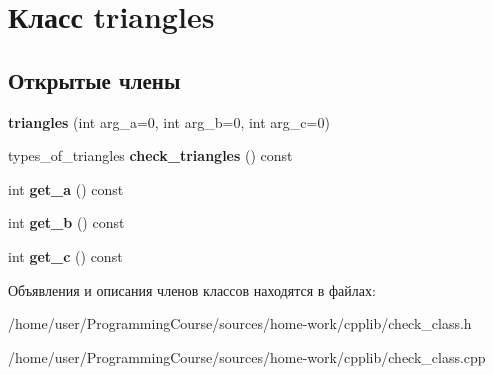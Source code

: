 \hypertarget{classtriangles}{\section{Класс triangles}
\label{classtriangles}
}
\subsection*{Открытые члены}
\begin{DoxyCompactItemize}
\item 
\hypertarget{classtriangles_a4dd5e3a7da283a2102661981b85dbd66}{{\bfseries triangles} (int arg\+\_\+a=0, int arg\+\_\+b=0, int arg\+\_\+c=0)}\label{classtriangles_a4dd5e3a7da283a2102661981b85dbd66}

\item 
\hypertarget{classtriangles_adb2135c351a8416cb284cd1e61eb32e3}{types\+\_\+of\+\_\+triangles {\bfseries check\+\_\+triangles} () const }\label{classtriangles_adb2135c351a8416cb284cd1e61eb32e3}

\item 
\hypertarget{classtriangles_a05d61fccb6914f46b382b5e72778b6e6}{int {\bfseries get\+\_\+a} () const }\label{classtriangles_a05d61fccb6914f46b382b5e72778b6e6}

\item 
\hypertarget{classtriangles_a35a5b69a86cb98d359ece84fd69ff0d3}{int {\bfseries get\+\_\+b} () const }\label{classtriangles_a35a5b69a86cb98d359ece84fd69ff0d3}

\item 
\hypertarget{classtriangles_ac400ed96af4155730a2eae623683b3a0}{int {\bfseries get\+\_\+c} () const }\label{classtriangles_ac400ed96af4155730a2eae623683b3a0}

\end{DoxyCompactItemize}


Объявления и описания членов классов находятся в файлах\+:\begin{DoxyCompactItemize}
\item 
/home/user/\+Programming\+Course/sources/home-\/work/cpplib/check\+\_\+class.\+h\item 
/home/user/\+Programming\+Course/sources/home-\/work/cpplib/check\+\_\+class.\+cpp\end{DoxyCompactItemize}
